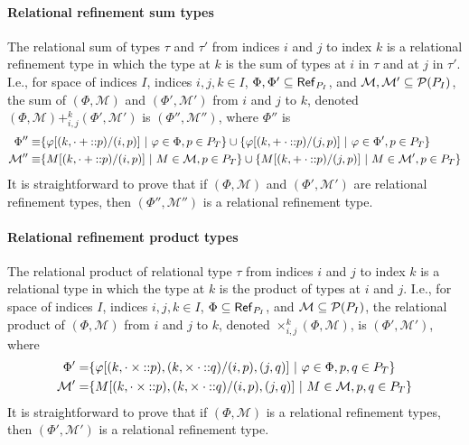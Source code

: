 \paragraph{Relational refinement sum types} The relational sum of
types $\tau$ and $\tau'$ from indices $i$ and $j$ to index $k$ is a
relational refinement type in which the type at $k$ is the sum of
types at $i$ in $\tau$ and at $j$ in $\tau'$.
%
I.e., for space of indices $I$, indices $i, j, k \in I$,
$\Phi, \Phi' \subseteq \mathsf{Ref}_{ P_{I} }$, and
$\mathcal{M}, \mathcal{M}' \subseteq \mathcal{P}(P_{I})$, the sum of
$(\Phi, \mathcal{M})$ and $(\Phi', \mathcal{M}')$ from $i$ and $j$ to
$k$, denoted $(\Phi, \mathcal{M}) +_{i, j}^k (\Phi', \mathcal{M}')$ is
$(\Phi'', \mathcal{M}'')$, where $\Phi''$ is
\begin{align*}
  \Phi'' \equiv & %
  \setformer{ \replace{ \varphi }{ (i, p) }{ (k, \tyleftsum \cons p) } }{ %
    \varphi \in \Phi, p \in \typos } \union %
  \setformer{ \replace{ \varphi }{ (j, p) }{(k, \tyrightsum \cons p)} }{ %
                  \varphi \in \Phi', p \in \typos } \\
  \mathcal{M}'' \equiv & %
  \setformer{ \replace{ M }{ (i, p) }{ (k, \tyleftsum \cons p) } }{ %
  M \in \mathcal{M}, p \in \typos } \union
  \setformer{ \replace{ M }{ (j, p) }{ (k, \tyrightsum \cons p) } }{ %
  M \in \mathcal{M}', p \in \typos }
\end{align*}
%
It is straightforward to prove that if $(\Phi, \mathcal{M})$ and
$(\Phi', \mathcal{M}')$ are relational refinement types, then
$(\Phi'', \mathcal{M}'')$ is a relational refinement type.

\paragraph{Relational refinement product types}
The relational product of relational type $\tau$ from indices $i$ and
$j$ to index $k$ is a relational type in which the type at $k$ is the
product of types at $i$ and $j$.
%
I.e., for space of indices $I$, indices $i, j, k \in I$,
$\Phi \subseteq \mathsf{Ref}_{ P_{I} }$, and
$\mathcal{M} \subseteq \mathcal{P}(P_{I})$, the relational product of
$(\Phi, \mathcal{M})$ from $i$ and $j$ to $k$, denoted
$\times_{i, j}^k (\Phi, \mathcal{M})$, is $(\Phi', \mathcal{M}')$,
where
\begin{align*}
  \Phi' = & \setformer{ %
    \replace{ \varphi }{ %
      (i, p), (j, q) }{ %
      (k, \tyleftprod \cons p), (k, \tyrightprod \cons q) } }{ %
    \varphi \in \Phi, p, q \in \typos } \\
  \mathcal{M}' = & \setformer{ %
    \replace{ M }{ %
    (i, p), (j, q) }{ %
    (k, \tyleftprod \cons p), (k, \tyrightprod \cons q) } }{ %
    M \in \mathcal{M}, p, q \in \typos }
\end{align*}
%
It is straightforward to prove that if $(\Phi, \mathcal{M})$ is a
relational refinement types, then $(\Phi', \mathcal{M}')$ is a
relational refinement type.

